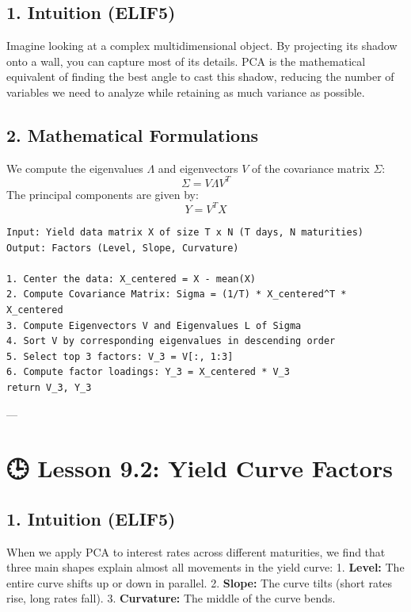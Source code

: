 \documentclass[11pt,oneside]{book}
\begin{document}
\subsection{1. Intuition (ELIF5)}
Imagine looking at a complex multidimensional object. By projecting its shadow onto a wall, you can capture most of its details. PCA is the mathematical equivalent of finding the best angle to cast this shadow, reducing the number of variables we need to analyze while retaining as much variance as possible.

\subsection{2. Mathematical Formulations}
We compute the eigenvalues $\Lambda$ and eigenvectors $V$ of the covariance matrix $\Sigma$:
$$\Sigma = V \Lambda V^T$$
The principal components are given by:
$$Y = V^T X$$

\begin{tcolorbox}[colback=white,colframe=black,boxrule=0.6pt,arc=0mm,title=Yield Curve Factor PCA]
\begin{verbatim}
Input: Yield data matrix X of size T x N (T days, N maturities)
Output: Factors (Level, Slope, Curvature)

1. Center the data: X_centered = X - mean(X)
2. Compute Covariance Matrix: Sigma = (1/T) * X_centered^T * X_centered
3. Compute Eigenvectors V and Eigenvalues L of Sigma
4. Sort V by corresponding eigenvalues in descending order
5. Select top 3 factors: V_3 = V[:, 1:3]
6. Compute factor loadings: Y_3 = X_centered * V_3
return V_3, Y_3
\end{verbatim}
\end{tcolorbox}

---

\section{🕒 Lesson 9.2: Yield Curve Factors}

\subsection{1. Intuition (ELIF5)}
When we apply PCA to interest rates across different maturities, we find that three main shapes explain almost all movements in the yield curve:
1. \textbf{Level:} The entire curve shifts up or down in parallel.
2. \textbf{Slope:} The curve tilts (short rates rise, long rates fall).
3. \textbf{Curvature:} The middle of the curve bends.
\end{document}
